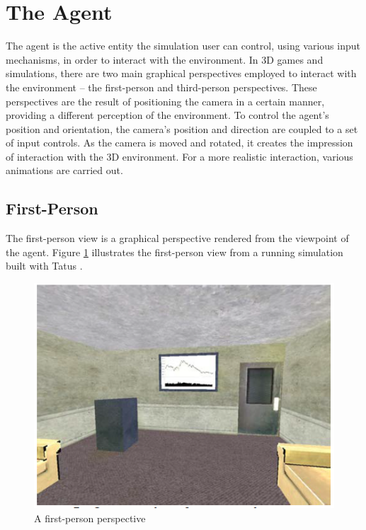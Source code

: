 \section{The Agent} %
\label{sec:the_agent}
The agent is the active entity the simulation user can control, using various input mechanisms, in order to interact with the environment. In 3D games and simulations, there are two main graphical perspectives employed to interact with the environment -- the first-person and third-person perspectives. These perspectives are the result of positioning the camera in a certain manner, providing a different perception of the environment. To control the agent's position and orientation, the camera's position and direction are coupled to a set of input controls. As the camera is moved and rotated, it creates the impression of interaction with the 3D environment. For a more realistic interaction, various animations are carried out.

\subsection{First-Person}\label{subsec:first_person}
The first-person view is a graphical perspective rendered from the viewpoint of the agent. Figure \ref{fig:fps} illustrates the first-person view from a running simulation built with Tatus \cite{o2005testbed}.

\begin{figure}[H]
	\centering
	\includegraphics[width=\linewidth]{gfx/Chapter3/fps}
	\caption{A first-person perspective}
	\label{fig:fps}
\end{figure}

